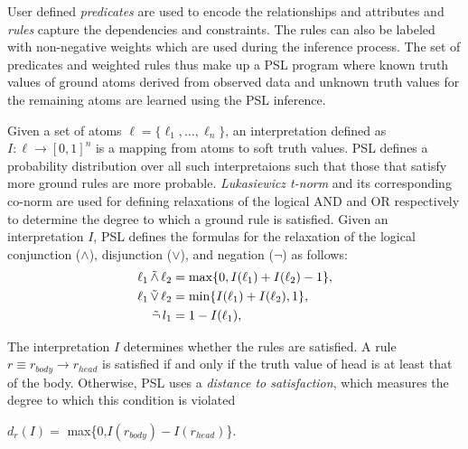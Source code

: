 User defined \emph{predicates} are used to encode the relationships and attributes and \emph{rules} capture the  dependencies and constraints.
The rules can also be
labeled with non-negative weights which are used during the inference process.
The set of predicates and weighted rules thus make up a PSL program where known truth values of ground atoms derived from observed data and unknown truth values for the remaining atoms are learned using the PSL inference.

Given a set of atoms 
$\ell = \{\ell_1,\ldots,\ell_n\}$,
an interpretation defined as 
$I : \ell \rightarrow [0,1]^n$
is a mapping from atoms to soft truth values.
PSL defines a probability distribution over all such interpretaions such that those that satisfy more ground rules are more probable.
\emph{Lukasiewicz t-norm} and its corresponding co-norm are used for defining relaxations of the logical AND and OR respectively to determine the degree to which a ground rule is satisfied.
Given an interpretation $\mathit{I}$, PSL defines the formulas for the relaxation of the logical conjunction ($\wedge$), disjunction ($\vee$), and negation ($\neg$) as follows:
\begin{align*}
\ell_1 \softand \ell_2 &= \max\{0, I(\ell_1) + I(\ell_2) - 1\},\\
\ell_1 \softor \ell_2 &= \min\{I(\ell_1) + I(\ell_2), 1\},\\
\softneg l_1 &= 1 - I(\ell_1),
\end{align*}  

{\color{red}
The interpretation $\mathit{I}$ determines whether the rules are
satisfied. A rule $\mathit{r} \equiv \mathit{r_{body}} \rightarrow
\mathit{r_{head}} $  is satisfied if and only if the truth value of head
is at least that of the body. Otherwise, PSL uses a \emph{distance to
satisfaction}, which measures the degree to which this condition is
violated}
\begin{center} 
 $\mathit{d_r}(\mathit{I}) =$ max\{0,$\mathit{I(r_{body})} - \mathit{I(r_{head})}$\}.
 \end{center}

